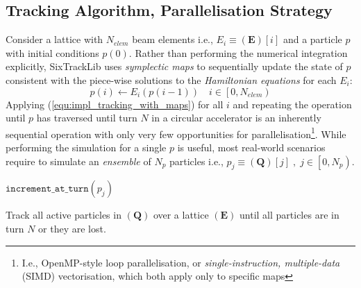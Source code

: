 \documentclass[a4paper,
               refpage,       %
               keeplastbox,   %
               ]{jacow}
\begin{document}
\subsection{Tracking Algorithm, Parallelisation Strategy}
Consider a lattice with $N_{elem}$ beam elements i.e., $E_i \equiv \left(\mathbf{E}\right)\left[i\right]$ and a particle $p$ with initial conditions $p\left(0\right)$. Rather than performing the numerical integration explicitly, SixTrackLib uses \textit{symplectic maps} to sequentially update the state of $p$ consistent with the piece-wise solutions to the \textit{Hamiltonian equations} for each $E_i$:
\begin{equation}
    \label{equ:impl_tracking_with_maps}
    p\left(i\right) \leftarrow E_i\left( p\left( i - 1 \right) \right) \quad i \in \left[0, N_{elem}\right)
\end{equation}
Applying (\ref{equ:impl_tracking_with_maps}) for all $i$ and repeating the operation until $p$ has traversed until turn $N$ in a circular accelerator is an inherently sequential operation with only very few opportunities for parallelisation\footnote{I.e.,  OpenMP-style loop parallelisation, or \textit{single-instruction, multiple-data} (SIMD) vectorisation, which both apply only to specific maps}. While performing the simulation for a single $p$ is useful, most real-world scenarios require to simulate an \textit{ensemble} of $N_{p}$ particles i.e., $p_j \equiv \left(\mathbf{Q}\right)\left[j\right]\;,\;j\in\left[0,N_{p}\right)$.
\begin{algorithm}[!hbt]
\begin{algorithmic}[1]
\label{alg1:line:loop_particles}
    \label{alg1:line:ref_p}
    \label{alg1:line:loop_turns} 
        \label{alg1:line:loop_lattice}
            \label{alg1:line:ref_elem}
            \label{alg1:line:apply_map}
            \label{alg1:line:is_lost_check}
            \EndIf
        \EndFor
        \label{alg1:line:is_lost_check2}
            \State $\texttt{increment\_at\_turn}(p_j)$\label{alg1:line:inc_turn}
        \EndIf
    \EndWhile
\EndFor
\EndProcedure
\end{algorithmic}
\caption{Track all active particles in $\left(\mathbf{Q}\right)$ over a lattice $\left(\mathbf{E}\right)$ until all particles are in turn $N$ or they are lost.}
\label{alg:track_until_turn}
\end{algorithm}
\end{document}
